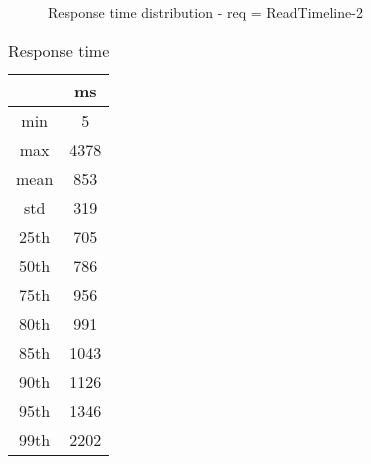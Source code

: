 \begin{minipage}{0.75\linewidth}
\begin{figure}[h]
\begin{adjustbox}{max width=1.0\linewidth, keepaspectratio}
  \end{adjustbox}
  \caption{Response time distribution - req = ReadTimeline-2}
\end{figure}
\end{minipage}\hfill\begin{minipage}{0.18\linewidth}
\begin{table}[h]
\begin{tabular}{|cc|}
\hline
\textbf{} & \textbf{ms}\\ \hline
 \Xhline{0.005\arrayrulewidth}
min & 5\\
 \Xhline{0.005\arrayrulewidth}
max & 4378\\
 \Xhline{0.005\arrayrulewidth}
mean & 853\\
 \Xhline{0.005\arrayrulewidth}
std & 319\\
\hline
\hline
 \Xhline{0.005\arrayrulewidth}
25th & 705\\
 \Xhline{0.005\arrayrulewidth}
50th & 786\\
 \Xhline{0.005\arrayrulewidth}
75th & 956\\
 \Xhline{0.005\arrayrulewidth}
80th & 991\\
 \Xhline{0.005\arrayrulewidth}
85th & 1043\\
 \Xhline{0.005\arrayrulewidth}
90th & 1126\\
 \Xhline{0.005\arrayrulewidth}
95th & 1346\\
 \Xhline{0.005\arrayrulewidth}
99th & 2202\\
\hline
\end{tabular}
\caption{Response time}
\end{table}
\end{minipage}\hfill